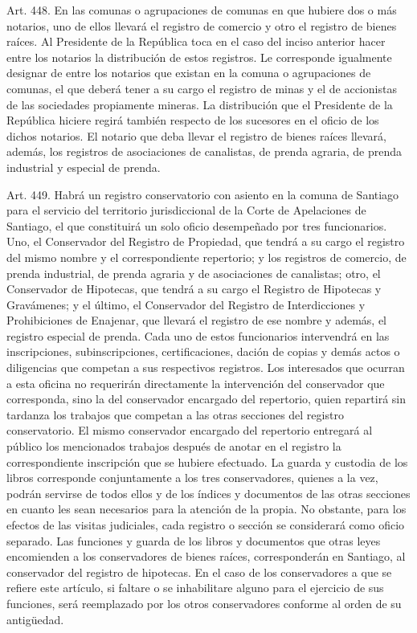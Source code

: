     Art. 448. En las comunas o agrupaciones de comunas en que hubiere dos o más notarios, uno de ellos llevará el registro de comercio y otro el registro de bienes raíces.
    Al Presidente de la República toca en el caso del inciso anterior hacer entre los notarios la distribución de estos registros.
    Le corresponde igualmente designar de entre los notarios que existan en la comuna o agrupaciones de comunas, el que deberá tener a su cargo el registro de minas y el de accionistas de las sociedades propiamente mineras.
    La distribución que el Presidente de la República hiciere regirá también respecto de los sucesores en el oficio de los dichos notarios.
    El notario que deba llevar el registro de bienes raíces llevará, además, los registros de asociaciones de canalistas, de prenda agraria, de prenda industrial y especial de prenda.



    Art. 449. Habrá un registro conservatorio con asiento en la comuna de Santiago para el servicio del territorio jurisdiccional de la Corte de Apelaciones de Santiago, el que constituirá un solo oficio desempeñado por tres funcionarios.
    Uno, el Conservador del Registro de Propiedad, que tendrá a su cargo el registro del mismo nombre y el correspondiente repertorio; y los registros de comercio, de prenda industrial, de prenda agraria y de asociaciones de canalistas; otro, el Conservador de Hipotecas, que tendrá a su cargo el Registro de Hipotecas y Gravámenes; y el último, el Conservador del Registro de Interdicciones y Prohibiciones de Enajenar, que llevará el registro de ese nombre y además, el registro especial de prenda.
    Cada uno de estos funcionarios intervendrá en las inscripciones, subinscripciones, certificaciones, dación de copias y demás actos o diligencias que competan a sus respectivos registros.
    Los interesados que ocurran a esta oficina no requerirán directamente la intervención del conservador que corresponda, sino la del conservador encargado del repertorio, quien repartirá sin tardanza los trabajos que competan a las otras secciones del registro conservatorio. El mismo conservador encargado del repertorio entregará al público los mencionados trabajos después de anotar en el registro la correspondiente inscripción que se hubiere efectuado.
    La guarda y custodia de los libros corresponde conjuntamente a los tres conservadores, quienes a la vez, podrán servirse de todos ellos y de los índices y documentos de las otras secciones en cuanto les sean necesarios para la atención de la propia.
    No obstante, para los efectos de las visitas judiciales, cada registro o sección se considerará como oficio separado.
    Las funciones y guarda de los libros y documentos que otras leyes encomienden a los conservadores de bienes raíces, corresponderán en Santiago, al conservador del registro de hipotecas.
    En el caso de los conservadores a que se refiere este artículo, si faltare o se inhabilitare alguno para el ejercicio de sus funciones, será reemplazado por los otros conservadores conforme al orden de su antigüedad.


